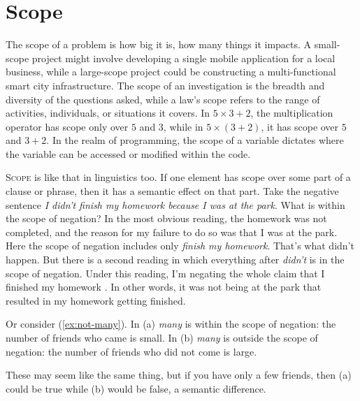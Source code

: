 \section{Scope}
The scope of a problem is how big it is, how many things it impacts. A small-scope project might involve developing a single mobile application for a local business, while a large-scope project could be constructing a multi-functional smart city infrastructure. The scope of an investigation is the breadth and diversity of the questions asked, while a law's scope refers to the range of activities, individuals, or situations it covers. In $5\times3+2$, the multiplication operator has scope only over $5$ and $3$, while in $5\times(3+2)$, it has scope over $5$ and $3+2$. In the realm of programming, the scope of a variable dictates where the variable can be accessed or modified within the code.

\textsc{Scope} is like that in linguistics too. If one element has scope over some part of a clause or phrase, then it has a semantic effect on that part. Take the negative sentence \textit{I didn't finish my homework because I was at the park}. What is within the scope of negation? In the most obvious reading, the homework was not completed, and the reason for my failure to do so was that I was at the park. Here the scope of negation includes only \textit{finish my homework}. That's what didn't happen. But there is a second reading in which everything after \textit{didn't} is in the scope of negation. Under this reading, I'm negating the whole claim that I finished my homework . In other words, it was not being at the park that resulted in my homework getting finished.

Or consider (\ref{ex:not-many}). In (a) \textit{many} is within the scope of negation: the number of friends who came is small. In (b) \textit{many} is outside the scope of negation: the number of friends who did not come is large.

\ea \label{ex:not-many}
    \z
\z

\noindent These may seem like the same thing, but if you have only a few friends, then (a) could be true while (b) would be false, a semantic difference.


